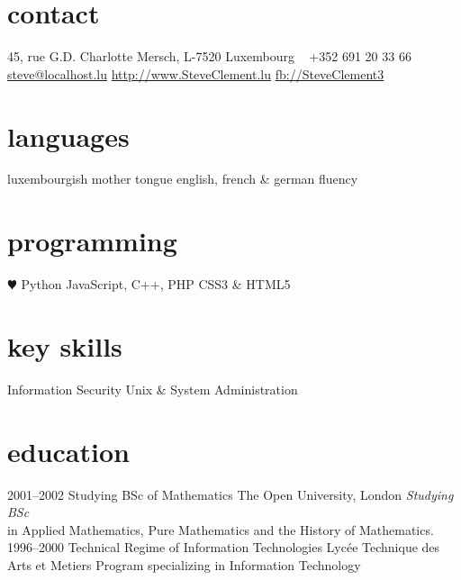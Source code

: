 \documentclass[]{friggeri-cv} %
\begin{document}


\begin{aside} %
\section{contact}
45, rue G.D. Charlotte
Mersch, L-7520
Luxembourg
~
+352 691 20 33 66
~
\href{mailto:steve@localhost.lu}{steve@localhost.lu}
\href{http://www.SteveClement.lu}{http://www.SteveClement.lu}
\href{http://facebook.com/SteveClement3}{fb://SteveClement3}
\section{languages}
luxembourgish mother tongue
english, french \& german fluency
\section{programming}
{\color{red} $\varheartsuit$} Python
JavaScript, C++, PHP
CSS3 \& HTML5
\section{key skills}
Information Security
Unix \& System Administration
\end{aside}


\section{education}

\begin{entrylist}
\entry
{2001--2002}
{Studying BSc {\normalfont of Mathematics}}
{The Open University, London}
{\emph{Studying BSc} \\ in Applied Mathematics, Pure Mathematics and the History of Mathematics.}
\entry
{1996--2000}
{Technical Regime {\normalfont of Information Technologies}}
{Lyc\'{e}e Technique des Arts et Metiers}
{Program specializing in Information Technology}

\end{entrylist}
\end{document}
